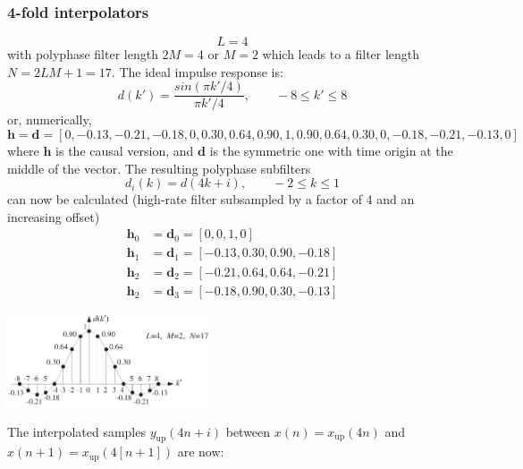 \subsubsection{4-fold interpolators}
\begin{equation*}
  L = 4
\end{equation*}
with polyphase filter length $2M=4$ or $M=2$ which leads to a filter length $N=2LM+1=17$.
The ideal impulse response is:
\begin{equation*}
  d(k')=\frac{sin(\pi k'/4)}{\pi k'/4}, \qquad -8 \leq k' \leq 8
\end{equation*}
or, numerically,
\begin{equation*}
  \mathbf{h} = \mathbf{d} = [0, -0.13, -0.21, -0.18, 0, 0.30, 0.64, 0.90, 1, 0.90, 0.64, 0.30, 0, -0.18, -0.21, -0.13, 0]
\end{equation*}
where $\mathbf{h}$ is the causal version, and $\mathbf{d}$ is the symmetric one with time origin at the middle of the vector.
The resulting polyphase subfilters
\begin{equation*}
  d_i(k) = d(4k + i), \qquad -2 \leq k \leq 1
\end{equation*}
can now be calculated (high-rate filter subsampled by a factor of 4 and an increasing offset)
\begin{align*}
  \mathbf{h}_0 &= \mathbf{d}_0 = [0, 0, 1, 0] \\
  \mathbf{h}_1 &= \mathbf{d}_1 = [-0.13, 0.30, 0.90, -0.18] \\
  \mathbf{h}_2 &= \mathbf{d}_2 = [-0.21, 0.64, 0.64, -0.21] \\
  \mathbf{h}_2 &= \mathbf{d}_3 = [-0.18, 0.90, 0.30, -0.13]
\end{align*}
\begin{center}
  \includegraphics[width=6cm]{images/IntDecOv_DesignExample.png}
\end{center}
The interpolated samples $y_{\text{up}}(4n+i)$ between $x(n)=x_{\text{up}}(4n)$ and $x(n+1)=x_{\text{up}}(4[n+1])$ are now:
